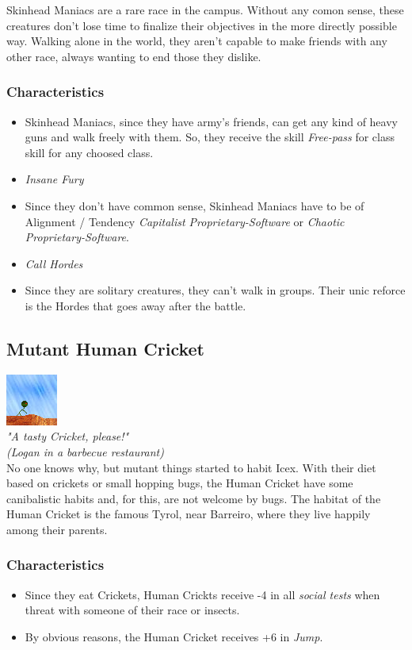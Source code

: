 \documentclass[ letterpaper,12pt]{article}
\begin{document}
Skinhead Maniacs are a rare race in the campus. Without any comon sense, these
creatures don't lose time to finalize their objectives in the more directly
possible way. Walking alone in the world, they aren't capable to make friends
with any other race, always wanting to end those they dislike.

\subsubsection{Characteristics}
\begin{itemize}
\item{Skinhead Maniacs, since they have army's friends, can get any kind of heavy guns and walk freely with them. So, they receive the skill {\it Free-pass} for class skill for any choosed class.}
\item{{\it Insane Fury}}
\item{Since they don't have common sense, Skinhead Maniacs have to be of Alignment / Tendency {\it Capitalist Proprietary-Software} or {\it Chaotic Proprietary-Software}.}
\item{{\it Call Hordes}}
\item{Since they are solitary creatures, they can't walk in groups. Their unic reforce is the Hordes that goes away after the battle.}
\end{itemize}

\subsection{Mutant Human Cricket}
\includegraphics{../data/races/Img/grilo.png}\\
{\it "A tasty Cricket, please!"\\
(Logan in a barbecue restaurant)}\\

No one knows why, but mutant things started to habit Icex. With their diet
based on crickets or small hopping bugs, the Human Cricket have some
canibalistic habits and, for this, are not welcome by bugs. The habitat of the
Human Cricket is the famous Tyrol, near Barreiro, where they live happily
among their parents.

\subsubsection{Characteristics}
\begin{itemize}
\item{Since they eat Crickets, Human Crickts receive -4 in all {\it social tests} when threat with someone of their race or insects.}
\item{By obvious reasons, the Human Cricket receives +6 in {\it Jump}.}
\end{itemize}
\end{document}
